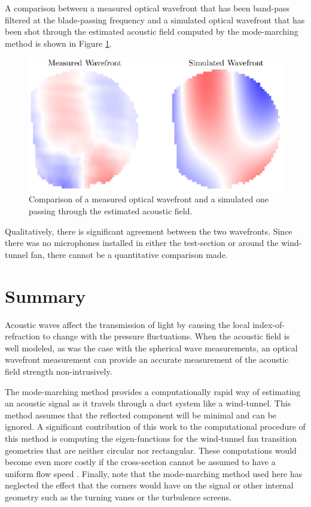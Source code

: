 A comparison between a measured optical wavefront that has been band-pass filtered at the blade-passing frequency and a simulated optical wavefront that has been shot through the estimated acoustic field computed by the mode-marching method is shown in Figure \ref{fig:03_tunnel_comparison}.
\begin{figure}
  \centering
  \includegraphics{../matlab/03_aero_optics_acoustics/tunnel_comparison.eps}
  \caption{Comparison of a measured optical wavefront and a simulated one passing through the estimated acoustic field.}
  \label{fig:03_tunnel_comparison}
\end{figure}
Qualitatively, there is significant agreement between the two wavefronts.
Since there was no microphones installed in either the test-section or around the wind-tunnel fan, there cannot be a quantitative comparison made.

\section{Summary}
\label{sect:03_summary}
Acoustic waves affect the transmission of light by causing the local index-of-refraction to change with the pressure fluctuations.
When the acoustic field is well modeled, as was the case with the spherical wave measurements, an optical wavefront measurement can provide an accurate measurement of the acoustic field strength non-intrusively.

The mode-marching method provides a computationally rapid way of estimating an acoustic signal as it travels through a duct system like a wind-tunnel.
This method assumes that the reflected component will be minimal and can be ignored.
A significant contribution of this work to the computational procedure of this method is computing the eigen-functions for the wind-tunnel fan transition geometries that are neither circular nor rectangular.
These computations would become even more costly if the cross-section cannot be assumed to have a uniform flow speed \cite{Wilson-2019-VV2zh7Au}.
Finally, note that the mode-marching method used here has neglected the effect that the corners would have on the signal or other internal geometry such as the turning vanes or the turbulence screens.

